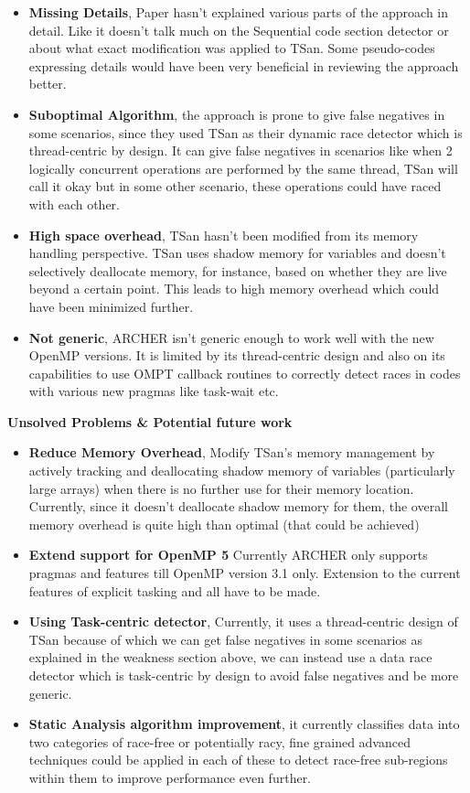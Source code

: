 \documentclass[a4paper]{article}
\begin{document}
\begin{itemize}
\item {\bf Missing Details}, Paper hasn't explained various parts of the approach in detail. Like it doesn't talk much on the Sequential code section detector or about what exact modification was applied to TSan. Some pseudo-codes expressing details would have been very beneficial in reviewing the approach better. 
\item {\bf Suboptimal Algorithm}, the approach is prone to give false negatives in some scenarios, since they used TSan as their dynamic race detector which is thread-centric by design. It can give false negatives in scenarios like when 2 logically concurrent operations are performed by the same thread, TSan will call it okay but in some other scenario, these operations could have raced with each other.
\item {\bf High space overhead}, TSan hasn't been modified from its memory handling perspective. TSan uses shadow memory for variables and doesn't selectively deallocate memory, for instance, based on whether they are live beyond a certain point. This leads to high memory overhead which could have been minimized further.
\item {\bf Not generic}, ARCHER isn't generic enough to work well with the new OpenMP versions. It is limited by its thread-centric design and also on its capabilities to use OMPT callback routines to correctly detect races in codes with various new pragmas like task-wait etc.
\end{itemize}
\vspace{1.0cm}
{\bf\Large Unsolved Problems \& Potential future work} \\
\begin{itemize}
\item {\bf Reduce Memory Overhead}, Modify TSan's memory management by actively tracking and deallocating shadow memory of variables (particularly large arrays) when there is no further use for their memory location. Currently, since it doesn't deallocate shadow memory for them, the overall memory overhead is quite high than optimal (that could be achieved)
\item {\bf Extend support for OpenMP 5} Currently ARCHER only supports pragmas and features till OpenMP version 3.1 only. Extension to the current features of explicit tasking and all have to be made.
\item {\bf Using Task-centric detector}, Currently, it uses a thread-centric design of TSan because of which we can get false negatives in some scenarios as explained in the weakness section above, we can instead use a data race detector which is task-centric by design to avoid false negatives and be more generic.
\item {\bf Static Analysis algorithm improvement}, it currently classifies data into two categories of race-free or potentially racy, fine grained advanced techniques could be applied in each of these to detect race-free sub-regions within them to improve performance even further.
\end{itemize}
\end{document}
